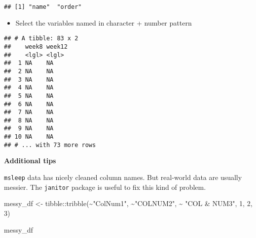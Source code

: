 \documentclass[
]{book}
\newenvironment{Shaded}{\begin{snugshade}}{\end{snugshade}}
\newcommand{\ConstantTok}[1]{\textcolor[rgb]{0.00,0.00,0.00}{#1}}
\newcommand{\DecValTok}[1]{\textcolor[rgb]{0.00,0.00,0.81}{#1}}
\newcommand{\FunctionTok}[1]{\textcolor[rgb]{0.00,0.00,0.00}{#1}}
\newcommand{\NormalTok}[1]{#1}
\newcommand{\OtherTok}[1]{\textcolor[rgb]{0.56,0.35,0.01}{#1}}
\newcommand{\SpecialCharTok}[1]{\textcolor[rgb]{0.00,0.00,0.00}{#1}}
\newcommand{\StringTok}[1]{\textcolor[rgb]{0.31,0.60,0.02}{#1}}
\providecommand{\tightlist}{%
  \setlength{\itemsep}{0pt}\setlength{\parskip}{0pt}}
\begin{document}
\begin{verbatim}
## [1] "name"  "order"
\end{verbatim}

\begin{itemize}
\tightlist
\item
  Select the variables named in character + number pattern
\end{itemize}

\begin{Shaded}
\end{Shaded}

\begin{verbatim}
## # A tibble: 83 x 2
##    week8 week12
##    <lgl> <lgl> 
##  1 NA    NA    
##  2 NA    NA    
##  3 NA    NA    
##  4 NA    NA    
##  5 NA    NA    
##  6 NA    NA    
##  7 NA    NA    
##  8 NA    NA    
##  9 NA    NA    
## 10 NA    NA    
## # ... with 73 more rows
\end{verbatim}

\textbf{Additional tips}

\texttt{msleep} data has nicely cleaned column names. But real-world data are usually messier. The \texttt{janitor} package is useful to fix this kind of problem.

\begin{Shaded}
\begin{Highlighting}[]
\NormalTok{messy\_df }\OtherTok{\textless{}{-}}\NormalTok{ tibble}\SpecialCharTok{::}\FunctionTok{tribble}\NormalTok{(}\SpecialCharTok{\textasciitilde{}}\StringTok{"ColNum1"}\NormalTok{, }\SpecialCharTok{\textasciitilde{}}\StringTok{"COLNUM2"}\NormalTok{, }\SpecialCharTok{\textasciitilde{}} \StringTok{"COL \& NUM3"}\NormalTok{,}
                            \DecValTok{1}\NormalTok{, }\DecValTok{2}\NormalTok{, }\DecValTok{3}\NormalTok{)}


\NormalTok{messy\_df}
\end{Highlighting}
\end{Shaded}
\end{document}
